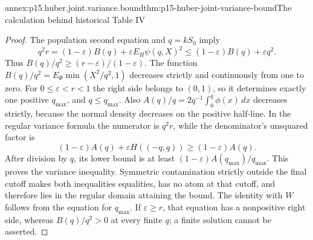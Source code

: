 \begin{annexitem}{annex:p15.huber.joint.variance.bound}{thm:p15-huber-joint-variance-bound}{The calculation behind historical Table IV}
\begin{proof}
The population second equation and \(q=kS_0\) imply
\[
 q^2r=(1-\varepsilon)B(q)+\varepsilon E_H\psi(q,X)^2
       \leq(1-\varepsilon)B(q)+\varepsilon q^2 .
\]
Thus \(B(q)/q^2\geq(r-\varepsilon)/(1-\varepsilon)\).
The function \(B(q)/q^2=E_\Phi\min(X^2/q^2,1)\) decreases
strictly and continuously from one to zero. For \(0\leq\varepsilon<r<1\)
the right side belongs to \((0,1)\), so it determines exactly one
positive \(q_{\max}\), and \(q\leq q_{\max}\).
Also \(A(q)/q=2q^{-1}\int_0^q\phi(x)\,dx\) decreases strictly,
because the normal density decreases on the positive half-line.
In the regular variance formula the numerator is \(q^2r\), while
the denominator's unsquared factor is
\[
 (1-\varepsilon)A(q)+\varepsilon H((-q,q))
       \geq(1-\varepsilon)A(q).
\]
After division by \(q\), its lower bound is at least
\((1-\varepsilon)A(q_{\max})/q_{\max}\).
This proves the variance inequality.
Symmetric contamination strictly outside the final cutoff makes
both inequalities equalities, has no atom at that cutoff, and
therefore lies in the regular domain attaining the bound.
The identity with \(W\) follows from the equation for \(q_{\max}\).
If \(\varepsilon\geq r\), that equation has a nonpositive right
side, whereas \(B(q)/q^2>0\) at every finite \(q\); a finite
solution cannot be asserted.
\end{proof}
\end{annexitem}

